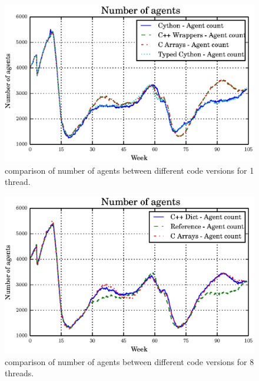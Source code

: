 \documentclass[12pt, a4paper]{report}
\begin{document}
\begin{figure}[H]
  \begin{center}
    \includegraphics[width=\columnwidth]{graphs/ag-single-comp.eps}
    \caption{comparison of number of agents between different code versions for 1 thread.}
    \label{fig:ag-single-comp}
  \end{center}
\end{figure}

\begin{figure}[H]
  \begin{center}
    \includegraphics[width=\columnwidth]{graphs/ag-multi-comp.eps}
    \caption{comparison of number of agents between different code versions for 8 threads.}
    \label{fig:ag-multi-comp}
  \end{center}
\end{figure}
\end{document}
